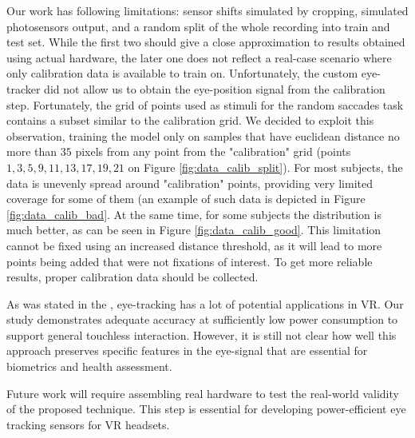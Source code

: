 Our work has following limitations: sensor shifts simulated by cropping, simulated photosensors output, and a random split of the whole recording into train and test set. While the first two should give a close approximation to results obtained using actual hardware, the later one does not reflect a real-case scenario where only calibration data is available to train on. Unfortunately, the custom eye-tracker did not allow us to obtain the eye-position signal from the calibration step. Fortunately, the grid of points used as stimuli for the random saccades task contains a subset similar to the calibration grid. We decided to exploit this observation, training the model only on samples that have euclidean distance no more than $35$ pixels from any point from the "calibration" grid (points $1, 3, 5, 9, 11, 13, 17, 19, 21$ on Figure \ref{fig:data_calib_split}). For most subjects, the data is unevenly spread around "calibration" points, providing very limited coverage for some of them (an example of such data is depicted in Figure \ref{fig:data_calib_bad}. At the same time, for some subjects the distribution is much better, as can be seen in Figure \ref{fig:data_calib_good}. This limitation cannot be fixed using an increased distance threshold, as it will lead to more points being added that were not fixations of interest. To get more reliable results, proper calibration data should be collected.

As was stated in the , eye-tracking has a lot of potential applications in VR. Our study demonstrates adequate accuracy at sufficiently low power consumption to support general touchless interaction. However, it is still not clear how well this approach preserves specific features in the eye-signal that are essential for biometrics and health assessment.

Future work will require assembling real hardware to test the real-world validity of the proposed technique. This step is essential for developing power-efficient eye tracking sensors for VR headsets.

